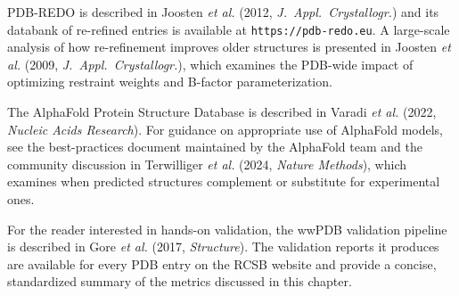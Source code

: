 PDB-REDO is described in Joosten \textit{et al.} (2012, \textit{J.\ Appl.\
Crystallogr.}) and its databank of re-refined entries is available at
\texttt{https://pdb-redo.eu}. A large-scale analysis of how re-refinement
improves older structures is presented in Joosten \textit{et al.} (2009,
\textit{J.\ Appl.\ Crystallogr.}), which examines the PDB-wide impact of
optimizing restraint weights and B-factor parameterization.

The AlphaFold Protein Structure Database is described in Varadi
\textit{et al.} (2022, \textit{Nucleic Acids Research}). For guidance on
appropriate use of AlphaFold models, see the best-practices document
maintained by the AlphaFold team and the community discussion in
Terwilliger \textit{et al.} (2024, \textit{Nature Methods}), which examines
when predicted structures complement or substitute for experimental ones.

For the reader interested in hands-on validation, the wwPDB validation
pipeline is described in Gore \textit{et al.} (2017, \textit{Structure}).
The validation reports it produces are available for every PDB entry on
the RCSB website and provide a concise, standardized summary of the metrics
discussed in this chapter.
